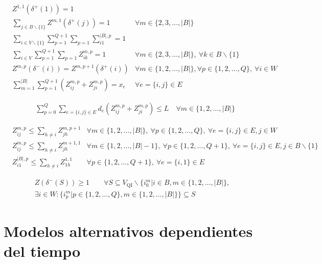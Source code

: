 \documentclass[10pt, a4paper]{article}
\theoremstyle{definition}
\begin{document}
\begin{align}
	& Z^{1,1}\left(\delta^{+}(1)\right)=1 \label{eq:30} \\
	& \sum_{j \in B \backslash\{1\}} Z^{m, 1}\left(\delta^{+}(j)\right)=1 & \forall m \in\{2,3, \ldots,|B|\} \label{eq:31} \\
	& \sum_{i \in V \backslash\{1\}} \sum_{p=1}^{Q+1} \sum_{p=1} \sum_{i 1}^{|B|, p}=1 \label{eq:32} \\
	& \sum_{i \in V} \sum_{p=1}^{Q+1} \sum_{p=1} Z_{i k}^{m, p}=1 & \forall m \in\{2,3, \ldots,|B|\},\ \forall k \in B \backslash\{1\} \label{eq:33} \\
	& Z^{m, p}\left(\delta^{-}(i)\right)=Z^{m, p+1}\left(\delta^{+}(i)\right) & \forall m \in\{1,2, \ldots,|B|\}, \forall p \in\{1,2, \ldots, Q\},\ \forall i \in W \label{eq:34} \\
	& \sum_{m=1}^{|B|} \sum_{p=1}^{Q+1}\left(Z_{i j}^{m, p}+Z_{j i}^{m, p}\right)=x_{e} & \forall e=\{i, j\} \in E \label{eq:35}
\end{align}

\begin{align}
	& \sum_{p=0}^{Q} \sum_{e=\{i, j\} \in E} d_{e}\left(Z_{i j}^{m, p}+Z_{j i}^{m, p}\right) \leq L \quad \forall m \in\{1,2, \ldots,|B|\} \label{eq:36}
\end{align}

\begin{align}
	& Z_{i j}^{m, p} \leq \sum_{h \neq i} Z_{j h}^{m, p+1} & \forall m \in\{1,2, \ldots,|B|\},\ \forall p \in\{1,2, \ldots, Q\},\ \forall e=\{i, j\} \in E, j \in W \label{eq:37} \\
	& Z_{i j}^{m, p} \leq \sum_{h \neq i} Z_{j h}^{m+1,1} & \forall m \in\{1,2, \ldots,|B|-1\},\ \forall p \in\{1,2, \ldots, Q+1\},\ \forall e=\{i, j\} \in E, j \in B \backslash\{1\} \label{eq:38} \\
	& Z_{i 1}^{|B|, p} \leq \sum_{h \neq i} Z_{1 h}^{1,1} & \forall p \in\{1,2, \ldots, Q+1\},\ \forall e=\{i, 1\} \in E \label{eq:39}
\end{align}

\begin{multline}
	 Z(\delta^{-}(S)) \geq 1 \quad \quad \forall S \subseteq V_{\mathrm{QI}} \backslash\{i_{0}^{m} | i \in B, m \in\{1,2, \ldots,|B|\}, \\
	 \exists i \in W : \{i_{p}^{m} | p \in \{1,2, \ldots, Q\}, m \in \{1,2, \ldots,|B|\}\} \subseteq S \label{eq:40}
\end{multline}

\section{Modelos alternativos dependientes del tiempo}
\end{document}
